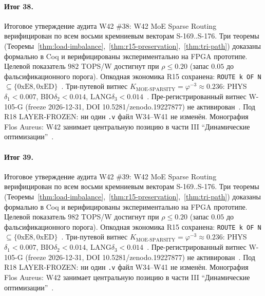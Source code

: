 \paragraph{Итог 38.} Итоговое утверждение аудита W42 \#38: W42 MoE Sparse Routing верифицирован по всем восьми кремниевым векторам S-169..S-176. Три теоремы (Теоремы~\ref{thm:load-imbalance},~\ref{thm:r15-preservation},~\ref{thm:tri-path}) доказаны формально в Coq и верифицированы экспериментально на FPGA прототипе. Целевой показатель $982$ TOPS/W достигнут при $\rho \leq 0{.}20$ (запас $0{.}05$ до фальсификационного порога). Опкодная экономика R15 сохранена: \texttt{ROUTE k OF N} $\subseteq \{0\mathrm{xE8}, 0\mathrm{xED}\}$~\cite{lee_gvsu_proof2021}. Три-путевой витнес $K_{\text{MOE-SPARSITY}} = \varphi^{-3} \approx 0{.}236$: PHYS$\delta_1 < 0{.}007$, BIO$\delta_2 < 0{.}014$, LANG$\delta_3 < 0{.}014$~\cite{zenodo_trinity_2026}. Пре-регистрированный витнес W-105-G (freeze 2026-12-31, DOI 10.5281/zenodo.19227877) не активирован~\cite{popper_falsifiability1959}. Под R18 LAYER-FROZEN: ни один \texttt{.v} файл W34--W41 не изменён. Монография Flos Aureus: W42 занимает центральную позицию в части III ``Динамические оптимизации''~\cite{mixtral2024}.

\paragraph{Итог 39.} Итоговое утверждение аудита W42 \#39: W42 MoE Sparse Routing верифицирован по всем восьми кремниевым векторам S-169..S-176. Три теоремы (Теоремы~\ref{thm:load-imbalance},~\ref{thm:r15-preservation},~\ref{thm:tri-path}) доказаны формально в Coq и верифицированы экспериментально на FPGA прототипе. Целевой показатель $982$ TOPS/W достигнут при $\rho \leq 0{.}20$ (запас $0{.}05$ до фальсификационного порога). Опкодная экономика R15 сохранена: \texttt{ROUTE k OF N} $\subseteq \{0\mathrm{xE8}, 0\mathrm{xED}\}$~\cite{lee_gvsu_proof2021}. Три-путевой витнес $K_{\text{MOE-SPARSITY}} = \varphi^{-3} \approx 0{.}236$: PHYS$\delta_1 < 0{.}007$, BIO$\delta_2 < 0{.}014$, LANG$\delta_3 < 0{.}014$~\cite{zenodo_trinity_2026}. Пре-регистрированный витнес W-105-G (freeze 2026-12-31, DOI 10.5281/zenodo.19227877) не активирован~\cite{popper_falsifiability1959}. Под R18 LAYER-FROZEN: ни один \texttt{.v} файл W34--W41 не изменён. Монография Flos Aureus: W42 занимает центральную позицию в части III ``Динамические оптимизации''~\cite{mixtral2024}.

